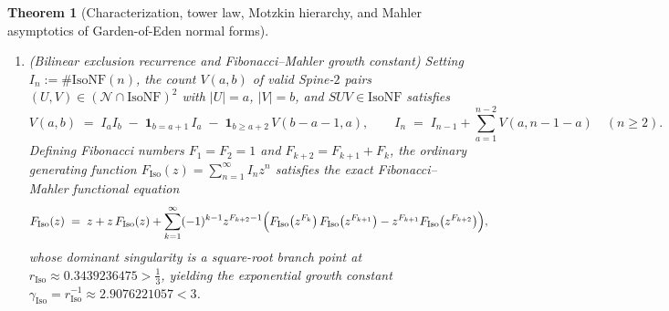 \documentclass[11pt,reqno]{amsart}
\numberwithin{equation}{section}
\theoremstyle{plain}
\newtheorem{theorem}{Theorem}[section]
\theoremstyle{definition}
\theoremstyle{remark}
\begin{document}
\begin{theorem}[Characterization, tower law, Motzkin hierarchy, and Mahler asymptotics of Garden-of-Eden normal forms]
\begin{enumerate}[label=(\roman*),leftmargin=2.2em]
\item \emph{(Bilinear exclusion recurrence and Fibonacci--Mahler growth constant)} Setting $I_n := \#\mathrm{IsoNF}(n)$, the count $V(a, b)$ of valid Spine-$2$ pairs $(U, V) \in (\mathcal{N} \cap \mathrm{IsoNF})^2$ with $|U| = a$, $|V| = b$, and $S U V \in \mathrm{IsoNF}$ satisfies
\begin{equation}
\label{eq:iso-bilinear-recurrence}
V(a, b) \;=\; I_a I_b \;-\; \mathbf{1}_{b = a + 1}\,I_a \;-\; \mathbf{1}_{b \ge a + 2}\,V(b - a - 1, a),
\qquad
I_n \;=\; I_{n-1} + \sum_{a=1}^{n-2} V(a, n - 1 - a) \quad (n \ge 2).
\end{equation}
Defining Fibonacci numbers $F_1 = F_2 = 1$ and $F_{k+2} = F_{k+1} + F_k$, the ordinary generating function $F_{\mathrm{Iso}}(z) = \sum_{n=1}^{\infty} I_n z^n$ satisfies the exact Fibonacci--Mahler functional equation
\begin{equation}
\label{eq:iso-mahler}
F_{\mathrm{Iso}}(z) \;=\; z + z\,F_{\mathrm{Iso}}(z) + \sum_{k=1}^{\infty} (-1)^{k-1} z^{F_{k+2}-1}\Bigl(F_{\mathrm{Iso}}\bigl(z^{F_k}\bigr)\,F_{\mathrm{Iso}}\bigl(z^{F_{k+1}}\bigr) - z^{F_{k+1}} F_{\mathrm{Iso}}\bigl(z^{F_{k+2}}\bigr)\Bigr),
\end{equation}
whose dominant singularity is a square-root branch point at $r_{\mathrm{Iso}} \approx 0.3439236475 > \frac{1}{3}$, yielding the exponential growth constant $\gamma_{\mathrm{Iso}} = r_{\mathrm{Iso}}^{-1} \approx 2.9076221057 < 3$.
\end{enumerate}
\end{theorem}
\end{document}
